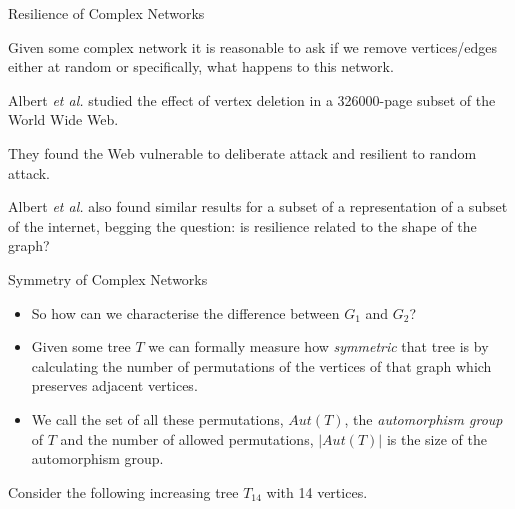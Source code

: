 \documentclass{beamer}
\begin{document}
\begin{frame}{Resilience of Complex Networks}

 Given some complex network it is reasonable to ask if we remove vertices/edges either at random or specifically, what happens to this network. 

\begin{example}

 Albert \emph{et al.} studied the effect of vertex deletion in a 326000-page subset of the World Wide Web.

They found the Web vulnerable to deliberate attack and resilient to random attack.    

\end{example}
Albert \emph{et al.} also found similar results for a subset of a representation of a subset of the internet, begging the question: is resilience related to the shape of the graph?
\end{frame}

\begin{frame}{Symmetry of Complex Networks}
\begin{itemize}
 \item[]So how can we characterise the difference between $G_{1}$ and $G_{2}$?
 \item[]Given some tree $T$ we can formally measure how \emph{symmetric} that tree is by calculating the number of permutations of the vertices of that graph which preserves adjacent vertices.
 \item[]We call the set of all these permutations, $Aut(T)$, the \emph{automorphism group} of $T$ and the number of allowed permutations, $|Aut(T)|$ is the size of the automorphism group.  
\end{itemize}
Consider the following increasing tree $T_{14}$ with 14 vertices.  
\begin{figure}[H]%
\centering
{}
\caption{}\label{fig2}
\end{figure}
\end{frame}
\end{document}
